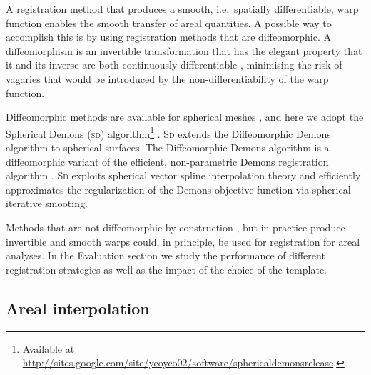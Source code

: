 A registration method that produces a smooth, i.e.\ spatially differentiable, warp function enables the smooth transfer of areal quantities. A possible way to accomplish this is by using registration methods that are diffeomorphic. A diffeomorphism is an invertible transformation that has the elegant property that it and its inverse are both continuously differentiable \citep{Christensen1996, Miller1997}, minimising the risk of vagaries that would be introduced by the non-differentiability of the warp function.

Diffeomorphic methods are available for spherical meshes \citep{Glaunes2004, Yeo2010, Robinson2014}, and here we adopt the Spherical Demons (\textsc{sd}) algorithm\footnote{Available at \href{http://sites.google.com/site/yeoyeo02/software/sphericaldemonsrelease}{http://sites.google.com/site/yeoyeo02/software/sphericaldemonsrelease}.} \citep{Yeo2010}. \textsc{Sd} extends the Diffeomorphic Demons algorithm \citep{Vercauteren2009} to spherical surfaces. The Diffeomorphic Demons algorithm is a diffeomorphic variant of the efficient, non-parametric Demons registration algorithm \citep{Thirion1998}. \textsc{Sd} exploits spherical vector spline interpolation theory and efficiently approximates the regularization of the Demons objective function via spherical iterative smooting.

Methods that are not diffeomorphic by construction \citep{Fischl1999_intersubject, Auzias2013}, but in practice produce invertible and smooth warps could, in principle, be used for registration for areal analyses. In the Evaluation section we study the performance of different registration strategies as well as the impact of the choice of the template.

\subsection{Areal interpolation}

